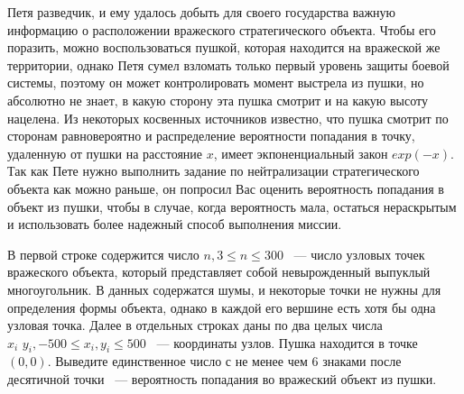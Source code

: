 Петя разведчик, и ему удалось добыть для своего государства
важную информацию о расположении вражеского стратегического
объекта. Чтобы его поразить, можно воспользоваться
пушкой, которая находится на вражеской же территории, однако
Петя сумел взломать только первый уровень защиты боевой
системы, поэтому он может контролировать момент выстрела
из пушки, но абсолютно не знает, в какую сторону эта пушка
смотрит и на какую высоту нацелена. Из некоторых косвенных
источников известно, что пушка смотрит по сторонам равновероятно
и распределение вероятности попадания в точку, удаленную
от пушки на расстояние $x$, имеет экпоненциальный закон
$exp(-x)$. Так как Пете нужно выполнить задание по нейтрализации
стратегического объекта как можно раньше, он попросил Вас
оценить вероятность попадания в объект из пушки, чтобы
в случае, когда вероятность мала, остаться нераскрытым
и использовать более надежный способ выполнения миссии.

\InputFile
В первой строке содержится число $n, 3 \le n \le 300$ ~--- число узловых точек
вражеского объекта, который представляет собой невырожденный выпуклый многоугольник.
В данных содержатся шумы, и некоторые точки не нужны для определения формы
объекта, однако в каждой его вершине есть хотя бы одна узловая точка.
Далее в отдельных строках даны по два целых числа
$x_i\,\,y_i, -500 \le x_i, y_i \le 500$ ~--- координаты узлов.
Пушка находится в точке $(0,0)$.
\OutputFile
Выведите единственное число с не менее чем 6 знаками после десятичной точки
~--- вероятность попадания во вражеский объект из пушки.

